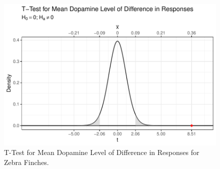 \documentclass{article}\usepackage[]{graphicx}\usepackage[]{xcolor}
\makeatletter
\def\maxwidth{ %
  \ifdim\Gin@nat@width>\linewidth
    \linewidth
  \else
    \Gin@nat@width
  \fi
}
\newenvironment{knitrout}{}{} %
\makeatother
\begin{document}
\begin{enumerate}
\begin{enumerate}
\begin{figure}[H]
\centering
\begin{knitrout}
\color{fgcolor}
\includegraphics[width=\maxwidth]{figure/unnamed-chunk-21-1} 
\end{knitrout}
\caption{T-Test for Mean Dopamine Level of Difference in Responses for Zebra Finches.}
\end{figure}
\end{enumerate}
\end{enumerate}



\end{document}
